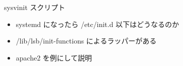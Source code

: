 \begin{frame}[containsverbatim]{sysvinit スクリプト}

\begin{itemize}
\item systemd になったら /etc/init.d 以下はどうなるのか
\item /lib/lsb/init-functions によるラッパーがある
\item apache2 を例にして説明

\end{itemize}

\end{frame}


%
%
%
%
%
%
%
%
%
%
%
%
%
% 
%
%
%

